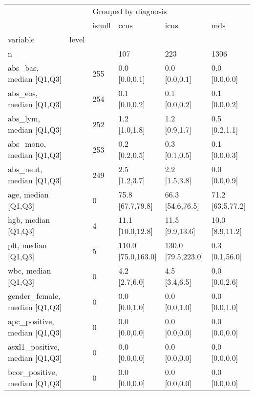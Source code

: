 \begin{tabular}{llllll}
\toprule
                 &     & \multicolumn{4}{l}{Grouped by diagnosis} \\
                 &     &               isnull &                ccus &                icus &               mds \\
variable & level &                      &                     &                     &                   \\
\midrule
n &     &                      &                 107 &                 223 &              1306 \\
abs\_bas, median [Q1,Q3] &     &                  255 &       0.0 [0.0,0.1] &       0.0 [0.0,0.1] &     0.0 [0.0,0.0] \\
abs\_eos, median [Q1,Q3] &     &                  254 &       0.1 [0.0,0.2] &       0.1 [0.0,0.2] &     0.1 [0.0,0.2] \\
abs\_lym, median [Q1,Q3] &     &                  252 &       1.2 [1.0,1.8] &       1.2 [0.9,1.7] &     0.5 [0.2,1.1] \\
abs\_mono, median [Q1,Q3] &     &                  253 &       0.2 [0.2,0.5] &       0.3 [0.1,0.5] &     0.1 [0.0,0.3] \\
abs\_neut, median [Q1,Q3] &     &                  249 &       2.5 [1.2,3.7] &       2.2 [1.5,3.8] &     0.0 [0.0,0.9] \\
age, median [Q1,Q3] &     &                    0 &    75.8 [67.7,79.8] &    66.3 [54.6,76.5] &  71.2 [63.5,77.2] \\
hgb, median [Q1,Q3] &     &                    4 &    11.1 [10.0,12.8] &     11.5 [9.9,13.6] &   10.0 [8.9,11.2] \\
plt, median [Q1,Q3] &     &                    5 &  110.0 [75.0,163.0] &  130.0 [79.5,223.0] &    0.3 [0.1,56.0] \\
wbc, median [Q1,Q3] &     &                    0 &       4.2 [2.7,6.0] &       4.5 [3.4,6.5] &     0.0 [0.0,2.6] \\
gender\_female, median [Q1,Q3] &     &                    0 &       0.0 [0.0,1.0] &       0.0 [0.0,1.0] &     0.0 [0.0,1.0] \\
apc\_positive, median [Q1,Q3] &     &                    0 &       0.0 [0.0,0.0] &       0.0 [0.0,0.0] &     0.0 [0.0,0.0] \\
asxl1\_positive, median [Q1,Q3] &     &                    0 &       0.0 [0.0,0.0] &       0.0 [0.0,0.0] &     0.0 [0.0,0.0] \\
bcor\_positive, median [Q1,Q3] &     &                    0 &       0.0 [0.0,0.0] &       0.0 [0.0,0.0] &     0.0 [0.0,0.0] \\

\end{tabular}
